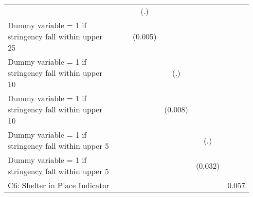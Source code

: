\begin{table}[htbp]
\begin{tabular}{l*{6}{c}}
                    &                     &                     &         (.)         &                     &                     &                     \\
\addlinespace
Dummy variable = 1 if stringency fall within upper 25%
                    &                     &                     &     (0.005)         &                     &                     &                     \\
\addlinespace
Dummy variable = 1 if stringency fall within upper 10%
                    &                     &                     &                     &         (.)         &                     &                     \\
\addlinespace
Dummy variable = 1 if stringency fall within upper 10%
                    &                     &                     &                     &     (0.008)         &                     &                     \\
\addlinespace
Dummy variable = 1 if stringency fall within upper 5%
                    &                     &                     &                     &                     &         (.)         &                     \\
\addlinespace
Dummy variable = 1 if stringency fall within upper 5%
                    &                     &                     &                     &                     &     (0.032)         &                     \\
\addlinespace
C6: Shelter in Place Indicator&                     &                     &                     &                     &                     &       0.057\sym{***}\\

\end{tabular}
\end{table}
